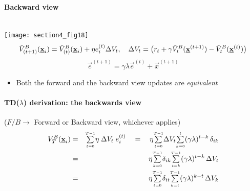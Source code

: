 \paragraph{Backward view}\mbox{}\\
	\texttt{[image: section4\_fig18]}
$$
		 \tilde V^{B}_{(t+1)}(\underline{\mathbf{x}}_i) 
		 = \tilde V^{B}_{(t)}(\underline{\mathbf{x}}_i)
		 	+\eta e_i^{(t)} \Delta V_t, \quad \Delta V_t 
		 = \big( r_t + \gamma \tilde V^{B}_t({\underline{\mathbf{x}}^{(t+1)}})	
					- \tilde V^{B}_t(\underline{\mathbf{x}}^{(t)})
			 \big)
$$
\vspace{-5mm}
$$
\vec e^{(t+1)} =\gamma \lambda \vec e^{(t)} + \vec x^{(t+1)}
$$
\vspace{-0.4cm}
\begin{itemize}
\item Both the forward and the backward view updates are \emph{equivalent}
\end{itemize}
\vspace{-0.2cm}


\paragraph{TD($\lambda$) derivation: the backwards view}
	\hfill {\small ($F/B \rightarrow$  Forward or Backward view, whichever applies)}
	\begin{eqnarray*}
		V^B_T(\underline{\mathbf{x}}_i) 
		&=& {\textstyle \sum\limits_{\scriptscriptstyle t=0}^{\scriptscriptstyle T-1}} \eta \; \Delta V_t \; e_i^{(t)} 
		\quad=\quad \eta {\textstyle \sum\limits_{\scriptscriptstyle t=0}^{\scriptscriptstyle T-1}}  \Delta V_t 
				{\textstyle \sum\limits_{\scriptscriptstyle k=0}^{\scriptscriptstyle t}} (\gamma\lambda)^{t-k} \, \delta_{ik} \\
		&=& \eta {\textstyle \sum\limits_{\scriptscriptstyle k=0}^{\scriptscriptstyle T-1}} \delta_{ik} 
			{\textstyle \sum\limits_{\scriptscriptstyle t=k}^{\scriptscriptstyle T-1}} (\gamma\lambda)^{t-k} \, \Delta V_t \\
		&=& \eta {\textstyle \sum\limits_{\scriptscriptstyle t=0}^{\scriptscriptstyle T-1}} \delta_{it} 
			{\textstyle \sum\limits_{\scriptscriptstyle k=t}^{\scriptscriptstyle T-1}} (\gamma\lambda)^{k-t} \, \Delta V_k
	\end{eqnarray*}

